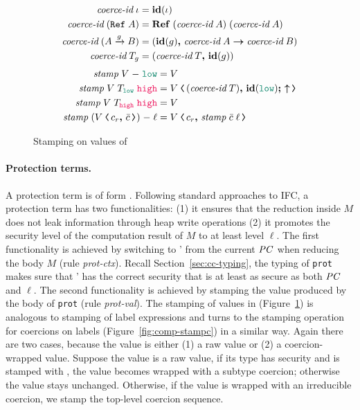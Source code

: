 \begin{figure}
  \begin{align*}
    \textit{coerce-id}\;\iota &= \mathit{\mathbf{id}}(\iota) \\
    \textit{coerce-id}\;(\mathtt{Ref}\;{A}) &= \mathbf{Ref}\;{(\textit{coerce-id}\;A)}\;{(\textit{coerce-id}\;A)} \\
    \textit{coerce-id}\;({A}\xrightarrow{{g}}{B}) &= ({\mathit{\mathbf{id}}(g)}\boldsymbol{,}\,{\textit{coerce-id}\;A}\boldsymbol{\rightarrow}{\textit{coerce-id}\;B}) \\
    \textit{coerce-id}\;T_g &= ({\textit{coerce-id}\;T}\boldsymbol{,}\,{\mathit{\mathbf{id}}(g)})
  \end{align*}
  \begin{align*}
    \mathit{stamp}\;V\;{-}\;\low &= V \\
    \mathit{stamp}\;V\;T_{\low}\;\high &= \cccast{V}{\coerc{(\textit{coerce-id}\;T)}{\id{\low} \seq \up}} \\
    \mathit{stamp}\;V\;T_{\high}\;\high &= V \\
    \mathit{stamp}\;(\cccast{V}{\coerc{c_r}{\bar{c}}})\;{-}\;\ell &= \cccast{V}{\coerc{c_r}{\mathit{stamp}\;\bar{c}\;\ell}}
  \end{align*}
  \caption{Stamping on values of \CC}
  \label{fig:stamp-val}
\end{figure}

\paragraph{Protection terms.} A protection term is of form
. Following standard approaches to IFC, a protection
term has two functionalities: (1) it ensures that the reduction inside $M$ does
not leak information through heap write operations (2) it promotes the security
level of the computation result of $M$ to at least level $\ell$. The first
functionality is achieved by switching to \PC' from the current $\mathit{PC}$ when
reducing the body $M$ (rule \textit{prot-ctx}). Recall
Section~\ref{sec:cc-typing}, the typing of \texttt{prot} makes sure that \PC'
has the correct security that is at least as secure as both $\mathit{PC}$ and $\ell$.
The second functionality is achieved by stamping the value produced by the body
of \texttt{prot} (rule \textit{prot-val}). The stamping of values in \CC
(Figure~\ref{fig:stamp-val}) is analogous to stamping of label expressions and
turns to the stamping operation for coercions on labels
(Figure~\ref{fig:comp-stampc}) in a similar way. Again there are two cases,
because the value is either (1) a raw value or (2) a coercion-wrapped value.
Suppose the value is a raw value, if its type has \low security and is stamped
with \high, the value becomes wrapped with a subtype coercion; otherwise the
value stays unchanged. Otherwise, if the value is wrapped with an irreducible
coercion, we stamp the top-level coercion sequence.

